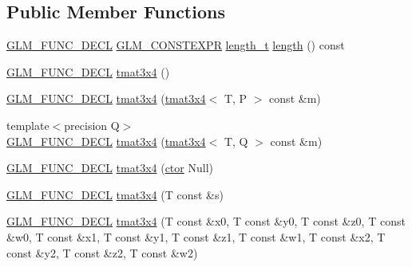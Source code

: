 \subsection*{Public Member Functions}
\begin{DoxyCompactItemize}
\item 
\hyperlink{setup_8hpp_ab2d052de21a70539923e9bcbf6e83a51}{G\+L\+M\+\_\+\+F\+U\+N\+C\+\_\+\+D\+E\+CL} \hyperlink{setup_8hpp_a08b807947b47031d3a511f03f89645ad}{G\+L\+M\+\_\+\+C\+O\+N\+S\+T\+E\+X\+PR} \hyperlink{namespaceglm_a090a0de2260835bee80e71a702492ed9}{length\+\_\+t} \hyperlink{structglm_1_1detail_1_1tmat3x4_affe011139232d4fb4f0ae6d993d8e99f}{length} () const
\item 
\hyperlink{setup_8hpp_ab2d052de21a70539923e9bcbf6e83a51}{G\+L\+M\+\_\+\+F\+U\+N\+C\+\_\+\+D\+E\+CL} \hyperlink{structglm_1_1detail_1_1tmat3x4_a6e581e5c4935bb4010e6ee4ae503290f}{tmat3x4} ()
\item 
\hyperlink{setup_8hpp_ab2d052de21a70539923e9bcbf6e83a51}{G\+L\+M\+\_\+\+F\+U\+N\+C\+\_\+\+D\+E\+CL} \hyperlink{structglm_1_1detail_1_1tmat3x4_ad712792f2a164d4ed2f84ee31226cacd}{tmat3x4} (\hyperlink{structglm_1_1detail_1_1tmat3x4}{tmat3x4}$<$ T, P $>$ const \&m)
\item 
{\footnotesize template$<$precision Q$>$ }\\\hyperlink{setup_8hpp_ab2d052de21a70539923e9bcbf6e83a51}{G\+L\+M\+\_\+\+F\+U\+N\+C\+\_\+\+D\+E\+CL} \hyperlink{structglm_1_1detail_1_1tmat3x4_ab8b7d443036f14500e635408e42be95c}{tmat3x4} (\hyperlink{structglm_1_1detail_1_1tmat3x4}{tmat3x4}$<$ T, Q $>$ const \&m)
\item 
\hyperlink{setup_8hpp_ab2d052de21a70539923e9bcbf6e83a51}{G\+L\+M\+\_\+\+F\+U\+N\+C\+\_\+\+D\+E\+CL} \hyperlink{structglm_1_1detail_1_1tmat3x4_a32a8b66fd3ff5ea24c91aa476f2268c7}{tmat3x4} (\hyperlink{structglm_1_1detail_1_1tmat3x4_aaf0d815b5c79dd7663c3532c8d03ade8}{ctor} Null)
\item 
\hyperlink{setup_8hpp_ab2d052de21a70539923e9bcbf6e83a51}{G\+L\+M\+\_\+\+F\+U\+N\+C\+\_\+\+D\+E\+CL} \hyperlink{structglm_1_1detail_1_1tmat3x4_ad8bf1b12863045314b88499921fe1e61}{tmat3x4} (T const \&s)
\item 
\hyperlink{setup_8hpp_ab2d052de21a70539923e9bcbf6e83a51}{G\+L\+M\+\_\+\+F\+U\+N\+C\+\_\+\+D\+E\+CL} \hyperlink{structglm_1_1detail_1_1tmat3x4_a81b6dd1cfa5b7835f6ae42fbd1565c37}{tmat3x4} (T const \&x0, T const \&y0, T const \&z0, T const \&w0, T const \&x1, T const \&y1, T const \&z1, T const \&w1, T const \&x2, T const \&y2, T const \&z2, T const \&w2)
\item 

\end{DoxyCompactItemize}
